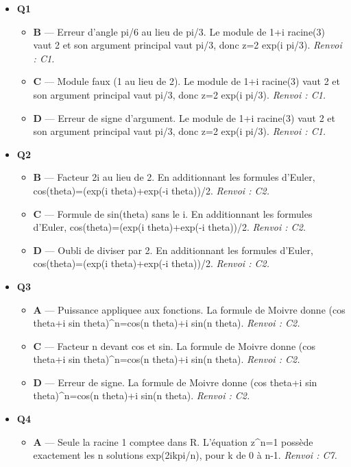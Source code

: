 \begin{itemize}
  \item \textbf{Q1}
  \begin{itemize}
    \item \textbf{B} — Erreur d'angle pi/6 au lieu de pi/3. Le module de 1+i racine(3) vaut 2 et son argument principal vaut pi/3, donc z=2 exp(i pi/3). \emph{Renvoi : C1.}
    \item \textbf{C} — Module faux (1 au lieu de 2). Le module de 1+i racine(3) vaut 2 et son argument principal vaut pi/3, donc z=2 exp(i pi/3). \emph{Renvoi : C1.}
    \item \textbf{D} — Erreur de signe d'argument. Le module de 1+i racine(3) vaut 2 et son argument principal vaut pi/3, donc z=2 exp(i pi/3). \emph{Renvoi : C1.}
  \end{itemize}
  \item \textbf{Q2}
  \begin{itemize}
    \item \textbf{B} — Facteur 2i au lieu de 2. En additionnant les formules d'Euler, cos(theta)=(exp(i theta)+exp(-i theta))/2. \emph{Renvoi : C2.}
    \item \textbf{C} — Formule de sin(theta) sans le i. En additionnant les formules d'Euler, cos(theta)=(exp(i theta)+exp(-i theta))/2. \emph{Renvoi : C2.}
    \item \textbf{D} — Oubli de diviser par 2. En additionnant les formules d'Euler, cos(theta)=(exp(i theta)+exp(-i theta))/2. \emph{Renvoi : C2.}
  \end{itemize}
  \item \textbf{Q3}
  \begin{itemize}
    \item \textbf{A} — Puissance appliquee aux fonctions. La formule de Moivre donne (cos theta+i sin theta)\textasciicircum{}n=cos(n theta)+i sin(n theta). \emph{Renvoi : C2.}
    \item \textbf{C} — Facteur n devant cos et sin. La formule de Moivre donne (cos theta+i sin theta)\textasciicircum{}n=cos(n theta)+i sin(n theta). \emph{Renvoi : C2.}
    \item \textbf{D} — Erreur de signe. La formule de Moivre donne (cos theta+i sin theta)\textasciicircum{}n=cos(n theta)+i sin(n theta). \emph{Renvoi : C2.}
  \end{itemize}
  \item \textbf{Q4}
  \begin{itemize}
    \item \textbf{A} — Seule la racine 1 comptee dans R. L'équation z\textasciicircum{}n=1 possède exactement les n solutions exp(2ikpi/n), pour k de 0 à n-1. \emph{Renvoi : C7.}

\end{itemize}
\end{itemize}
